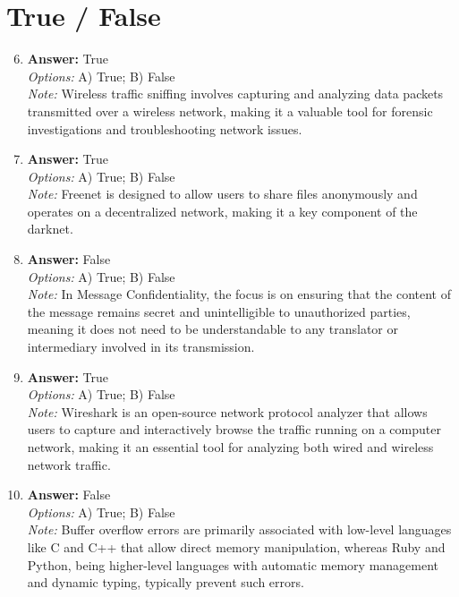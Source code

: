 \documentclass[12pt]{article}
\begin{document}
\section*{True / False}
\begin{enumerate}[label=\arabic*.]
\setcounter{enumi}{5}
\item \textbf{Answer:} True
\\ \textit{Options:} A) True; B) False
\\ \textit{Note:} Wireless traffic sniffing involves capturing and analyzing data packets transmitted over a wireless network, making it a valuable tool for forensic investigations and troubleshooting network issues.
\item \textbf{Answer:} True
\\ \textit{Options:} A) True; B) False
\\ \textit{Note:} Freenet is designed to allow users to share files anonymously and operates on a decentralized network, making it a key component of the darknet.
\item \textbf{Answer:} False
\\ \textit{Options:} A) True; B) False
\\ \textit{Note:} In Message Confidentiality, the focus is on ensuring that the content of the message remains secret and unintelligible to unauthorized parties, meaning it does not need to be understandable to any translator or intermediary involved in its transmission.
\item \textbf{Answer:} True
\\ \textit{Options:} A) True; B) False
\\ \textit{Note:} Wireshark is an open-source network protocol analyzer that allows users to capture and interactively browse the traffic running on a computer network, making it an essential tool for analyzing both wired and wireless network traffic.
\item \textbf{Answer:} False
\\ \textit{Options:} A) True; B) False
\\ \textit{Note:} Buffer overflow errors are primarily associated with low-level languages like C and C++ that allow direct memory manipulation, whereas Ruby and Python, being higher-level languages with automatic memory management and dynamic typing, typically prevent such errors.
\end{enumerate}
\end{document}
